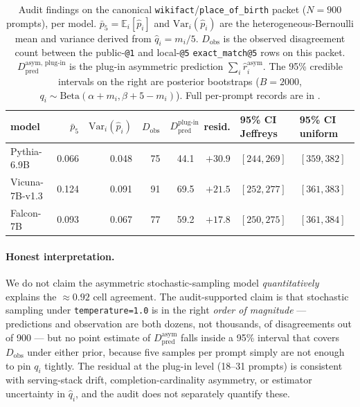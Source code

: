 \documentclass[11pt]{article}
\begin{document}
\begin{table}[htbp]
\centering
\small
\caption{Audit findings on the canonical
  \texttt{wikifact}/\texttt{place\_of\_birth} packet ($N = 900$
  prompts), per model.
$\bar{p}_5 = \mathbb{E}_i[\hat p_i]$ and $\mathrm{Var}_i(\hat p_i)$
  are the heterogeneous-Bernoulli mean and variance derived from
  $\hat q_i = m_i / 5$.
$D_{\text{obs}}$ is the observed disagreement count between the
  public-\texttt{@1} and local-\texttt{@5} \texttt{exact\_match@5}
  rows on this packet.
$D_{\text{pred}}^{\text{asym, plug-in}}$ is the plug-in asymmetric
  prediction $\sum_i \hat r_i^{\text{asym}}$.
The 95\% credible intervals on the right are posterior bootstraps
  ($B = 2000$, $q_i \sim \mathrm{Beta}(\alpha + m_i, \beta + 5 - m_i)$).
Full per-prompt records are in
  .}
\label{tab:tr-case-c-audit}
\begin{tabular}{lrrrrrll}
\toprule
model & $\bar{p}_5$ & $\mathrm{Var}_i(\hat p_i)$ & $D_{\text{obs}}$
      & $D_{\text{pred}}^{\text{plug-in}}$
      & resid.
      & 95\% CI Jeffreys & 95\% CI uniform \\
\midrule
Pythia-6.9B    & 0.066 & 0.048 & 75 & 44.1 & $+30.9$ & $[244, 269]$ & $[359, 382]$ \\
Vicuna-7B-v1.3 & 0.124 & 0.091 & 91 & 69.5 & $+21.5$ & $[252, 277]$ & $[361, 383]$ \\
Falcon-7B      & 0.093 & 0.067 & 77 & 59.2 & $+17.8$ & $[250, 275]$ & $[361, 384]$ \\
\bottomrule
\end{tabular}
\end{table}

\paragraph{Honest interpretation.}
We do not claim the asymmetric stochastic-sampling model
  \emph{quantitatively} explains the $\approx 0.92$ cell agreement.
The audit-supported claim is that stochastic sampling under
  \texttt{temperature=1.0} is in the right \emph{order of magnitude}
  --- predictions and observation are both dozens, not thousands, of
  disagreements out of 900 --- but no point estimate of
  $D_{\text{pred}}^{\text{asym}}$ falls inside a 95\% interval that
  covers $D_{\text{obs}}$ under either prior, because five samples
  per prompt simply are not enough to pin $q_i$ tightly.
The residual at the plug-in level (18--31 prompts) is consistent
  with serving-stack drift, completion-cardinality asymmetry, or
  estimator uncertainty in $\hat q_i$, and the audit does not
  separately quantify these.
\end{document}
